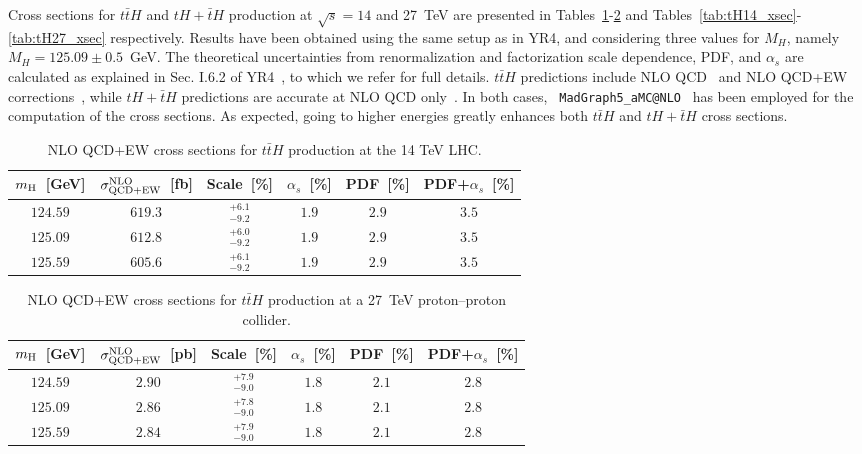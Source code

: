  

\label{sec:he-lhc-ttH}
Cross sections for $t\bar{t}H$ and $tH+\bar{t}H$ production at
$\sqrt{s}=14$ and 27~TeV are presented in Tables~\ref{tab:ttH14_xsec}-\ref{tab:ttH27_xsec}
and Tables~\ref{tab:tH14_xsec}-\ref{tab:tH27_xsec} respectively. Results have been obtained using the same setup as
in YR4, and considering three values for $M_H$, namely $M_H=125.09\pm
0.5$~GeV. The theoretical uncertainties from renormalization and
factorization scale dependence, PDF, and $\alpha_s$ are calculated as
explained in Sec. I.6.2 of YR4~\cite{deFlorian:2016spz}, to which we
refer for full details. $t\bar{t}H$ predictions include NLO
QCD~\cite{Beenakker:2001rj,Beenakker:2002nc,Reina:2001sf,Dawson:2002tg,Dawson:2003zu,Yu:2014cka,Frixione:2015zaa}
and NLO QCD+EW
corrections~\cite{Yu:2014cka,Frixione:2014qaa,Frixione:2015zaa}, while
$tH+\bar{t}H$ predictions are accurate at NLO QCD
only~\cite{Demartin:2015uha}. In both cases, {\tt
MadGraph5\_aMC@NLO}~\cite{Alwall:2014hca,Frederix:2018nkq} has been
employed for the computation of the cross sections. As expected, going
to higher energies greatly enhances both $t\bar{t}H$ and $tH+\bar{t}H$
cross sections.


\begin{table}
\centering
\begin{tabular}{cccccc}
\toprule
$m_{\rm H}$~[GeV] & $\sigma^{\rm NLO}_{\rm QCD+EW}$~[fb] & Scale~[\%] &
$\alpha_s$~[\%] & PDF~[\%] & PDF+${\alpha_s}$~[\%]\\
\midrule
$124.59$ & $619.3$ & $^{+6.1}_{-9.2}$ & $1.9$ & $2.9$ & $3.5$ \\
$125.09$ & $612.8$ & $^{+6.0}_{-9.2}$ & $1.9$ & $2.9$ & $3.5$ \\
$125.59$ & $605.6$ & $^{+6.1}_{-9.2}$ & $1.9$ & $2.9$ & $3.5$ \\
\bottomrule
\end{tabular}
\caption{NLO QCD+EW cross sections for $t\bar tH$ production at the 14 TeV LHC.}
\label{tab:ttH14_xsec}
\end{table}

\begin{table}
\centering
\begin{tabular}{cccccc}
\toprule
$m_{\rm H}$~[GeV] & $\sigma^{\rm NLO}_{\rm QCD+EW}$~[pb] & Scale~[\%] &
$\alpha_s$~[\%] & PDF~[\%] & PDF+${\alpha_s}$~[\%]\\
\midrule
$124.59$ & $2.90$ & $^{+7.9}_{-9.0}$ & $1.8$ & $2.1$ & $2.8$ \\
$125.09$ & $2.86$ & $^{+7.8}_{-9.0}$ & $1.8$ & $2.1$ & $2.8$ \\
$125.59$ & $2.84$ & $^{+7.9}_{-9.0}$ & $1.8$ & $2.1$ & $2.8$ \\
\bottomrule
\end{tabular}
\caption{NLO QCD+EW cross sections for $t\bar tH$ production at a 27~TeV proton--proton collider.}
\label{tab:ttH27_xsec}
\end{table}

